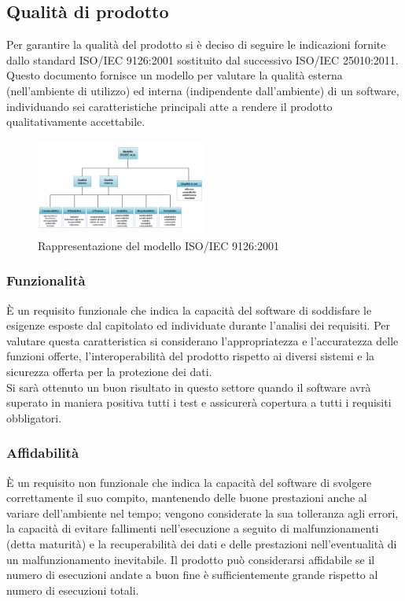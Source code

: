 \subsection{Qualità di prodotto}
Per garantire la qualità del prodotto si è deciso di seguire le indicazioni fornite dallo standard ISO/IEC 9126:2001 sostituito dal successivo ISO/IEC 25010:2011. Questo documento fornisce un modello per valutare la qualità esterna (nell’ambiente di utilizzo) ed interna (indipendente dall’ambiente) di un software, individuando sei caratteristiche principali atte a rendere il prodotto qualitativamente accettabile.

\begin{figure}[h]
  \centering
    \includegraphics[width=0.5\textwidth]{./images/ISO-IEC_9126}
  \caption{Rappresentazione del modello ISO/IEC 9126:2001}
  \label{fig:ISO-IEC_9126}
\end{figure}


\subsubsection{Funzionalità}
È un requisito funzionale che indica la capacità del software di soddisfare le esigenze esposte dal capitolato ed individuate durante l’analisi dei requisiti. Per valutare questa caratteristica si considerano l'appropriatezza e l'accuratezza delle funzioni offerte, l'interoperabilità del prodotto rispetto ai diversi sistemi e la sicurezza offerta per la protezione dei dati.\\ 
Si sarà ottenuto un buon risultato in questo settore quando il software avrà superato in maniera positiva tutti i test e assicurerà copertura a tutti i requisiti obbligatori.

\subsubsection{Affidabilità}
È un requisito non funzionale che indica la capacità del software di svolgere correttamente il suo compito, mantenendo delle buone prestazioni anche al variare dell'ambiente nel tempo; vengono considerate la sua tolleranza agli errori, la capacità di evitare fallimenti nell’esecuzione a seguito di malfunzionamenti (detta maturità) e la recuperabilità dei dati e delle prestazioni nell'eventualità di un malfunzionamento inevitabile. Il prodotto può considerarsi affidabile se il numero di esecuzioni andate a buon fine è sufficientemente grande rispetto al numero di esecuzioni totali.

